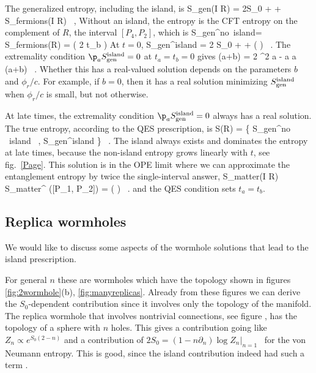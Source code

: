 The generalized entropy, including the island, is
\be\label{SgenFermion}
S_{\rm gen}(I \cup R) = 2S_0 +  +   S_{\rm fermions}(I \cup R) \ ,
\ee
Without an island, the entropy is the CFT entropy on the complement of $R$, the interval $[P_4, P_2]$, which is
\be
S_{\rm gen}^{\rm no~island}= S_{\rm fermions}(R) = 
 \log \left(
{2 \cosh t_b } 
\right)
\ee
At $t=0$, 
\be {}
S_{\rm gen}^{\rm island}  = 2 S_0 +  + \log \left(
\right) \ .
\ee
The extremality condition $\p_a S_{\rm gen}^{\rm island} = 0$ at $t_a=t_b = 0$ gives
\be {}
 \sinh (a+b) = 2 \sinh^2 a - \sinh a \cosh a \sinh(a+b) \ .
\ee
Whether this has a real-valued solution depends on the parameters $b$ and $\phi_r/c$. For example, if $b=0$, then it has a real solution minimizing $S_{\rm gen}^{\rm island}$ when $\phi_r/c$ is small, but not otherwise. 

At late times, the extremality condition $\p_a S_{\rm gen}^{\rm island} = 0$ always has a real solution. The true entropy, according to the QES prescription, is 
\be
S(R) =
\min\left\{ S_{\rm gen}^{\rm no ~island} \ ,   S_{\rm gen}^{\rm island}   \right\} \ .
\ee
The island always exists and dominates the entropy at late times, because the non-island entropy grows linearly with $t$, see   fig.~\ref{Page}. This solution is in the OPE limit where we can approximate the entanglement entropy by twice the single-interval answer,
\be
S_{\rm matter}(I \cup R)  S_{\rm matter}^{\rm   } ([P_1, P_2]) =
 \log \left(
\right) \ .
\ee
and the QES condition sets $t_a = t_b$. 

\subsection{Replica wormholes} 


We would like to discuss some aspects of the wormhole solutions that lead to the island prescription. 

For general $n$ these are wormholes which have the topology shown in figures \ref{fig:2wormhole}(b), \ref{fig:manyreplicas}. 
Already from these figures we can derive the  $S_0$-dependent contribution  
since it involves only the topology of the manifold. The replica wormhole that involves nontrivial connections, 
see figure   
, has the topology of a sphere with $n$ holes. This gives a contribution going like 
$Z_n \propto e^{ S_0( 2-n)}$ and a contribution of $2S_0 = (1 - n\partial_n) \log Z_n   |_{n=1}$ \,  for the von Neumann entropy. This is good, since the island contribution 
indeed had such a term . 


